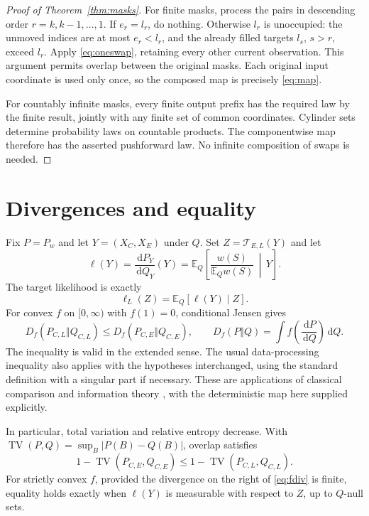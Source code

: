 \documentclass[11pt,a4paper]{article}
\theoremstyle{remark}\newtheorem*{ednote}{Editorial note (ProveIt, 2026-10-01)}
\newcommand{\E}{\mathbb E}\newcommand{\N}{\mathbb N}\newcommand{\R}{\mathbb R}
\newcommand{\TV}{\operatorname{TV}}\newcommand{\KL}{\operatorname{KL}}
\newcommand{\dd}{\,\mathrm d}\newcommand{\ii}{\mathrm i}
\begin{document}
\begin{proof}[Proof of Theorem~\ref{thm:masks}]
For finite masks, process the pairs in descending order $r=k,k-1,\ldots,1$. If $e_r=l_r$, do nothing. Otherwise $l_r$ is unoccupied: the unmoved indices are at most $e_r<l_r$, and the already filled targets $l_s$, $s>r$, exceed $l_r$. Apply \eqref{eq:oneswap}, retaining every other current observation. This argument permits overlap between the original masks. Each original input coordinate is used only once, so the composed map is precisely \eqref{eq:map}.

For countably infinite masks, every finite output prefix has the required law by the finite result, jointly with any finite set of common coordinates. Cylinder sets determine probability laws on countable products. The componentwise map therefore has the asserted pushforward law. No infinite composition of swaps is needed.
\end{proof}

\section{Divergences and equality}
Fix $P=P_w$ and let $Y=(X_C,X_E)$ under $Q$. Set $Z=\mathcal T_{E,L}(Y)$ and let
\[
 \ell(Y)=\frac{\dd P_Y}{\dd Q_Y}(Y)
 =\E_Q\left[\frac{w(S)}{\E_Qw(S)}\,\middle|\,Y\right].
\]
The target likelihood is exactly
\begin{equation}\label{eq:likelihood}
 \ell_L(Z)=\E_Q[\ell(Y)\mid Z].
\end{equation}
For convex $f$ on $[0,\infty)$ with $f(1)=0$, conditional Jensen gives
\begin{equation}\label{eq:fdiv}
 D_f(P_{C,L}\Vert Q_{C,L})\le D_f(P_{C,E}\Vert Q_{C,E}),
 \qquad D_f(P\Vert Q)=\int f\!\left(\frac{\dd P}{\dd Q}\right)\dd Q.
\end{equation}
The inequality is valid in the extended sense. The usual data-processing inequality also applies with the hypotheses interchanged, using the standard definition with a singular part if necessary. These are applications of classical comparison and information theory \cite{blackwell}, with the deterministic map here supplied explicitly.

In particular, total variation and relative entropy decrease. With
$\TV(P,Q)=\sup_B|P(B)-Q(B)|$, overlap satisfies
\begin{equation}\label{eq:overlap}
 1-\TV(P_{C,E},Q_{C,E})\le1-\TV(P_{C,L},Q_{C,L}).
\end{equation}
For strictly convex $f$, provided the divergence on the right of \eqref{eq:fdiv} is finite, equality holds exactly when $\ell(Y)$ is measurable with respect to $Z$, up to $Q$-null sets.
\end{document}
